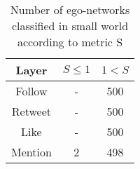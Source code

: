 \begin{table}[h!tb]
    \renewcommand{\arraystretch}{1.3}
    \caption{Number of ego-networks classified in small world according to metric S}
    \label{tab:small_world}
    \centering
    \scriptsize
    \setlength\tabcolsep{6pt} %
    \begin{tabular}{|c|c|c|}
        \hline
        {\bf Layer} &   {\bf$S \leq 1$} &   {\bf$1 < S$ }\\ \hline \hline
        Follow      &       -       &       500     \\  \hline
        Retweet     &       -       &       500     \\  \hline
        Like        &       -       &       500     \\  \hline
        Mention     &       2       &       498     \\  \hline\hline 
    \end{tabular}
\end{table}